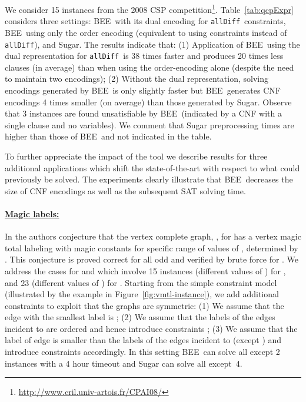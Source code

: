 \documentclass{tlp}
\newcommand{\allDifferent}{\texttt{allDiff}}
\newcommand{\bee}{\textsf{BEE}}
\begin{document}
We consider 15 instances from the 2008 CSP
competition\footnote{\url{http://www.cril.univ-artois.fr/CPAI08/}}.
Table~\ref{tab:qcpExpr} considers three settings: \bee\ with its dual
encoding for \allDifferent\ constraints, \bee\ using only the order
encoding (equivalent to using  constraints instead of
\allDifferent), and Sugar. The results indicate that:
(1) Application of \bee\ using the dual representation for
\allDifferent\ is 38 times faster and produces 20 times less clauses
(in average) than when using the order-encoding alone (despite the
need to maintain two encodings);
(2) Without the dual representation, solving encodings generated by
\bee\ is only slightly faster but \bee\ generates CNF encodings 4
times smaller (on average) than those generated by Sugar.
Observe that 3 instances are found unsatisfiable by \bee\ (indicated
by a CNF with a single clause and no variables). We comment that Sugar
preprocessing times are higher than those of \bee\ and not indicated
in the table.



\bigskip To further appreciate the impact of the tool we describe
results for three additional applications which shift the
state-of-the-art with respect to what could previously be solved.
The experiments clearly illustrate that \bee\ decreases the size of
CNF encodings as well as the subsequent SAT solving time.

\vspace{-3mm}
\paragraph{\underline{Magic labels:}}
In \cite{MacDougall2002} the authors conjecture that the  vertex
complete graph, , for  has a vertex magic total labeling
with magic constants for specific range of values of , determined
by . This conjecture is proved correct for all odd  and verified
by brute force for .
We address the cases for  and  which involve 15 instances
(different values of ) for , and 23 (different values of )
for . Starting from the simple constraint model (illustrated by
the example in Figure~\ref{fig:vmtl-instance}), we add additional
constraints to exploit that the graphs are symmetric:
(1) We assume that the edge with the smallest label is ; 
(2) We assume that the labels of the edges incident to  are
ordered and hence introduce constraints ; 
(3) We assume that the label of edge  is smaller than the
labels of the edges incident to  (except ) and introduce
constraints accordingly.
In this setting \bee\ can solve all except 2 instances with a 4 hour
timeout and Sugar can solve all except~4.
\end{document}
